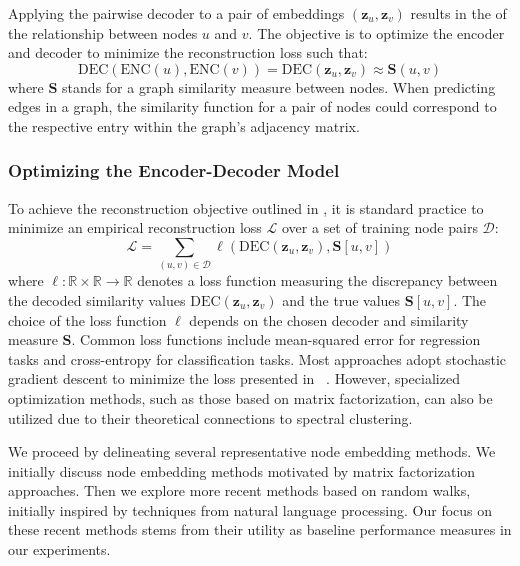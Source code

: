 Applying the pairwise decoder to a pair of embeddings $ (\mathbf{z}_u, \mathbf{z}_v) $ results in the  of the relationship between nodes $ u $ and $ v $. The objective is to optimize the encoder and decoder to minimize the reconstruction loss such that:
\begin{equation}\label{eq:reconstruction}
    \text{DEC}(\text{ENC}(u), \text{ENC}(v)) = \text{DEC}(\mathbf{z}_u, \mathbf{z}_v) \approx \textbf{S}(u,v)
\end{equation}
where $ \textbf{S} $ stands for a graph similarity measure between nodes. When predicting edges in a graph, the similarity function for a pair of nodes could correspond to the respective entry within the graph's adjacency matrix.

\subsubsection{Optimizing the Encoder-Decoder Model}
To achieve the reconstruction objective outlined in , it is standard practice to minimize an empirical reconstruction loss $ \mathcal{L} $ over a set of training node pairs $ \mathcal{D} $:
\begin{equation}\label{eq:loss}
    \mathcal{L} = \sum_{(u,v)\in\mathcal{D}} \ell(\text{DEC}(\mathbf{z}_u, \mathbf{z}_v), \textbf{S}[u,v])
\end{equation}
where $ \ell: \mathbb{R}\times\mathbb{R}\to\mathbb{R} $ denotes a loss function measuring the discrepancy between the decoded similarity values $ \text{DEC}(\mathbf{z}_u, \mathbf{z}_v) $ and the true values $ \textbf{S}[u,v] $. The choice of the loss function $ \ell $ depends on the chosen decoder and similarity measure $ \textbf{S} $. Common loss functions include mean-squared error for regression tasks and cross-entropy for classification tasks. Most approaches adopt stochastic gradient descent to minimize the loss presented in ~\cite{Robbins1951stochasticApproximation}. However, specialized optimization methods, such as those based on matrix factorization, can also be utilized due to their theoretical connections to spectral clustering.

We proceed by delineating several representative node embedding methods. We initially discuss node embedding methods motivated by matrix factorization approaches. Then we explore more recent methods based on random walks, initially inspired by techniques from natural language processing. Our focus on these recent methods stems from their utility as baseline performance measures in our experiments.

